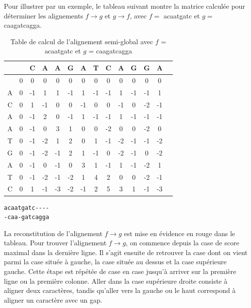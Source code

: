 \documentclass{article}
\begin{document}
\newpage
Pour illustrer par un exemple, le tableau suivant montre la matrice calculée pour déterminer les alignements $f \to g$ et $g \to f$, avec $f =$ acaatgatc et $g =$ caagatcagga.

\begin{table}[h]
	\centering
	\begin{tabular}{|c|c|c|c|c|c|c|c|c|c|c|c|c|c|}
		\hline
		&& C & A & A & G & A & T & C & A & G & G & A\\		
		\hline
		& 0 & 0 & 0 & 0 & 0 & 0 & 0 & 0 & 0 & 0 & \cellcolor{lightgreen}0 & 0  \\
		\hline 
		A&\cellcolor{lightred}0 & -1 & 1 & 1 & -1 & 1 & -1 & -1 & 1 & -1 & -1 &\cellcolor{lightgreen}1 \\
		\hline 
		C&0 & \cellcolor{lightred}1 & -1 & 0 & 0 & -1 & 0 & 0 & -1 & 0 & -2 & -1 \\
		\hline 
		A&0 & -1 & \cellcolor{lightred}2 & 0 & -1 & 1 & -1 & -1 & 1 & -1 & -1 & -1  \\
		\hline 
		A&0 & -1 & 0 & \cellcolor{lightred}3 & 1 & 0 & 0 & -2 & 0 & 0 & -2 & 0 \\
		\hline 
		T&0 & -1 & -2 & \cellcolor{lightred}1 & 2 & 0 & 1 & -1 & -2 & -1 & -1 & -2  \\
		\hline 
		G&0 & -1 & -2 & -1 & \cellcolor{lightred}2 & 1 & -1 & 0 & -2 & -1 & 0 & -2  \\
		\hline 
		A&0 & -1 & 0 & -1 & 0 & \cellcolor{lightred}3 & 1 & -1 & 1 & -1 & -2 & 1  \\
		\hline 
		T&0 & -1 & -2 & -1 & -2 & 1 & \cellcolor{lightred}4 & 2 & 0 & 0 & -2 & -1  \\
		\hline 
		C&0 & 1 & -1 & -3 & -2 & -1 & 2 & \cellcolor{lightred}5 & 3 & 1 & -1 & -3  \\
		\hline 
	\end{tabular}	
	\caption{Table de calcul de l'alignement semi-global avec $f$ = acaatgatc et $g$ = caagatcagga}
\end{table}


\begin{verbatim}
acaatgatc----
-caa-gatcagga
\end{verbatim}

La reconstitution de l'alignement $f \to g$ est mise en évidence en rouge dans le tableau. Pour trouver l'alignement $f \to g$, on  commence depuis la case de score maximal dans la dernière ligne. Il s'agit ensuite de retrouver la case dont on vient parmi la case située à gauche, la case située au dessus et la case supérieure gauche. Cette étape est répétée de case en case jusqu'à arriver sur la première ligne ou la première colonne. Aller dans la case supérieure droite consiste à aligner deux caractères, tandis qu'aller vers la gauche ou le haut correspond à aligner un caractère avec un gap.
\end{document}
